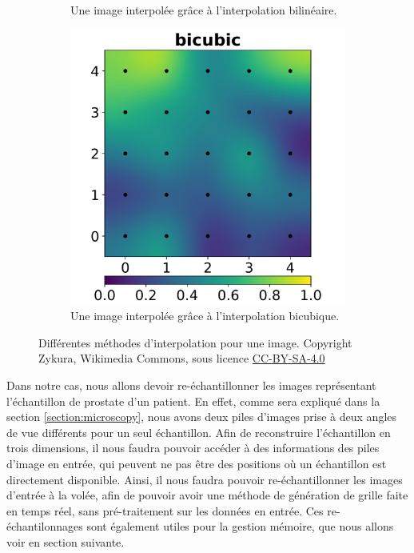 {{{\begin{figure}[h]
\begin{subfigure}{.32\linewidth}
			        \captionsetup{width=.9\linewidth}
			        \caption{Une image interpolée grâce à l'interpolation bilinéaire.}
			        \label{img:resampling:bilinear}
			    \end{subfigure}
			    \begin{subfigure}{.32\linewidth}
			        \centering
			        \includegraphics[width=.9\linewidth]{img/image_interpolation_bicubic.png}
			        \captionsetup{width=.9\linewidth}
			        \caption{Une image interpolée grâce à l'interpolation bicubique.}
			        \label{img:resampling:bicubic}
			    \end{subfigure}
			    \captionsetup{width=.9\linewidth}
			    \caption{Différentes méthodes d'interpolation pour une image. Copyright Zykura, Wikimedia Commons, sous licence \href{https://creativecommons.org/licenses/by-sa/4.0/deed.en}{CC-BY-SA-4.0}}
			    \label{img:resampling}
			\end{figure}

			Dans notre cas, nous allons devoir re-échantillonner les images représentant l'échantillon de prostate d'un patient. En effet, comme sera expliqué dans la section \ref{section:microscopy}, nous avons deux piles d'images prise à deux angles de vue différents pour un seul échantillon. Afin de reconstruire l'échantillon en trois dimensions, il nous faudra pouvoir accéder à des informations des piles d'image en entrée, qui peuvent ne pas être des positions où un échantillon est directement disponible. Ainsi, il nous faudra pouvoir re-échantillonner les images d'entrée à la volée, afin de pouvoir avoir une méthode de génération de grille faite en temps réel, sans pré-traitement sur les données en entrée. Ces re-échantilonnages sont également utiles pour la gestion mémoire, que nous allons voir en section suivante.
		}
	}

}
